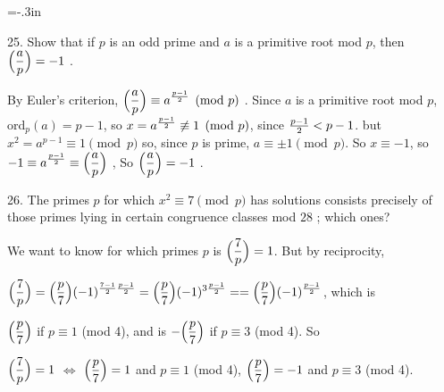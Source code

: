 
\parindent=0pt


\vsize=8.5in
\voffset=-.3in

\ctln{\centerline}
\ssk{\smallskip}
\msk{\medskip}
\bsk{\bigskip}

\overfullrule=0pt
\nopagenumbers




\bsk

\item{25.} Show that if $p$ is an odd prime and $a$ is a primitive root
mod $p$, then $\displaystyle \Big({{a}\over{p}}\Big) = -1$ .

\msk

By Euler's criterion, $\displaystyle \Big({{a}\over{p}}\Big) \equiv a^{{p-1}\over{2}}\pmod{p}$ .
Since $a$ is a primitive root mod $p$, ord$_p(a)=p-1$, so 
$x=a^{{p-1}\over{2}}\not\equiv 1\pmod{p}$, since ${{p-1}\over{2}}<p-1$.
but $x^2=a^{p-1}\equiv 1\pmod{p}$ so, since $p$ is prime, $a\equiv \pm1\pmod{p}$.
So $x\equiv -1$, so $\displaystyle -1\equiv a^{{p-1}\over{2}}\equiv \Big({{a}\over{p}}\Big) $ ,
So $\displaystyle \Big({{a}\over{p}}\Big) = -1$ .

\msk

\item{26.} The primes $p$ for which $x^2\equiv 7\pmod{p}$ has solutions 
consists precisely of those primes 
lying in certain congruence classes mod $28$ ; which ones?

\msk

We want to know for which primes $p$ is
$\displaystyle \Big({{7}\over{p}}\Big) = 1$. But by reciprocity, 

$\displaystyle \Big({{7}\over{p}}\Big)=\Big({{p}\over{7}}\Big)(-1)^{{{7-1}\over{2}}{{p-1}\over{2}}}
=\Big({{p}\over{7}}\Big)(-1)^{3{{p-1}\over{2}}} = 
=\Big({{p}\over{7}}\Big)(-1)^{{{p-1}\over{2}}}$, which is

\ssk

$\displaystyle \Big({{p}\over{7}}\Big)$ if $p\equiv 1$ (mod 4), and is
$\displaystyle -\Big({{p}\over{7}}\Big)$ if $p\equiv 3$ (mod 4). So 

\ssk

$\displaystyle \Big({{7}\over{p}}\Big) = 1$ $\Leftrightarrow$ 
$\displaystyle \Big({{p}\over{7}}\Big)=1$ and $p\equiv 1$ (mod 4), 
$\displaystyle \Big({{p}\over{7}}\Big)=-1$ and $p\equiv 3$ (mod 4).

\msk

